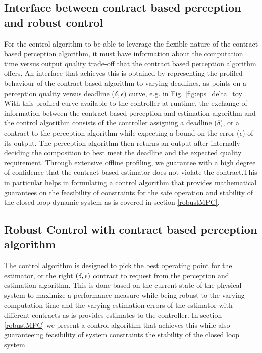 
\subsection{Interface between contract based perception and robust control}

For the control algorithm to be able to leverage the flexible nature of the contract based perception algorithm, it must have information about the computation time versus output quality trade-off that the contract based perception algorithm offers. An interface that achieves this is obtained by representing the profiled behaviour of the contract based algorithm to varying deadlines, as points on a perception quality versus deadline ($\delta, \epsilon$) curve, e.g. in Fig. \ref{fig:eps_delta_toy}.
With this profiled curve available to the controller at runtime, the exchange of information between the contract based perception-and-estimation algorithm and the control algorithm consists of the controller assigning a deadline ($\delta$), or a contract to the perception algorithm while expecting a bound on the error ($\epsilon$) of its output. The perception algorithm then returns an output after internally deciding the composition to best meet the deadline and the expected quality requirement. 
Through extensive offline profiling, we guarantee with a high degree of confidence that the contract based estimator does not violate the contract.This in particular helps in formulating a control algorithm that provides mathematical guarantees on the feasibility of constraints for the safe operation and stability of the closed loop dynamic system as is covered in section \ref{robustMPC}.

\subsection{Robust Control with contract based perception algorithm}

The control algorithm is designed to pick the best operating point for the estimator, or the right $(\delta,\epsilon)$ contract to request from the perception and estimation algorithm. This is done based on the current state of the physical system to maximize a performance measure while being robust to the varying computation time and the varying estimation errors of the estimator with different contracts as is provides estimates to the controller. In section \ref{robustMPC} we present a control algorithm that achieves this while also guaranteeing feasibility of system constraints the stability of the closed loop system.






